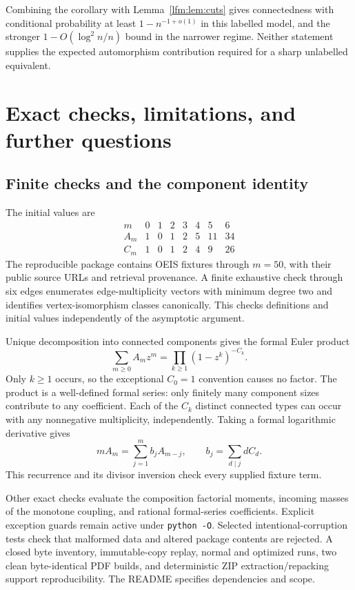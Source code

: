 \documentclass[11pt,letterpaper]{article}
\theoremstyle{remark}\newtheorem{remark}[theorem]{Remark}
\begin{document}
Combining the corollary with Lemma~\ref{lfm:lem:cuts} gives connectedness with conditional probability at least $1-n^{-1+o(1)}$ in this labelled model, and the stronger $1-O(\log^2n/n)$ bound in the narrower regime. Neither statement supplies the expected automorphism contribution required for a sharp unlabelled equivalent.

\section{Exact checks, limitations, and further questions}\label{lfm:sec:checks}
\subsection{Finite checks and the component identity}
The initial values are
\[
\begin{array}{c|rrrrrrr}
 m&0&1&2&3&4&5&6\\\hline
 A_m&1&0&1&2&5&11&34\\
 C_m&1&0&1&2&4&9&26
\end{array}
\]
The reproducible package contains OEIS fixtures through $m=50$, with their public source URLs and retrieval provenance. A finite exhaustive check through six edges enumerates edge-multiplicity vectors with minimum degree two and identifies vertex-isomorphism classes canonically. This checks definitions and initial values independently of the asymptotic argument.

Unique decomposition into connected components gives the formal Euler product
\begin{equation}
 \sum_{m\ge0}A_mz^m=\prod_{k\ge1}(1-z^k)^{-C_k}.\label{lfm:eq:euler}
\end{equation}
Only $k\ge1$ occurs, so the exceptional $C_0=1$ convention causes no factor. The product is a well-defined formal series: only finitely many component sizes contribute to any coefficient. Each of the $C_k$ distinct connected types can occur with any nonnegative multiplicity, independently. Taking a formal logarithmic derivative gives
\begin{equation}
 mA_m=\sum_{j=1}^m b_jA_{m-j},\qquad
 b_j=\sum_{d\mid j}dC_d.\label{lfm:eq:eulerrec}
\end{equation}
This recurrence and its divisor inversion check every supplied fixture term.

Other exact checks evaluate the composition factorial moments, incoming masses of the monotone coupling, and rational formal-series coefficients. Explicit exception guards remain active under \texttt{python -O}. Selected intentional-corruption tests check that malformed data and altered package contents are rejected. A closed byte inventory, immutable-copy replay, normal and optimized runs, two clean byte-identical PDF builds, and deterministic ZIP extraction/repacking support reproducibility. The README specifies dependencies and scope.
\end{document}
